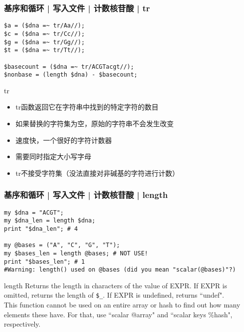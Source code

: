 \begin{frame}[fragile]
  \frametitle{基序和循环 | 写入文件 | 计数核苷酸 | \alert{tr}}
\begin{lstlisting}
$a = ($dna =~ tr/Aa//);
$c = ($dna =~ tr/Cc//);
$g = ($dna =~ tr/Gg//);
$t = ($dna =~ tr/Tt//);

$basecount = ($dna =~ tr/ACGTacgt//);
$nonbase = (length $dna) - $basecount;
\end{lstlisting}
\pause
\begin{block}{tr}
  \begin{itemize}
    \item tr函数返回它在字符串中找到的特定字符的数目
    \item 如果替换的字符集为空，原始的字符串不会发生改变
    \item 速度快，一个很好的字符计数器
    \item 需要同时指定大小写字母
    \item tr不接受字符集（没法直接对非碱基的字符进行计数）
  \end{itemize}
\end{block}
\end{frame}

\begin{frame}[fragile]
  \frametitle{基序和循环 | 写入文件 | 计数核苷酸 | \alert{length}}
\begin{lstlisting}
my $dna = "ACGT";
my $dna_len = length $dna;
print "$dna_len"; # 4

my @bases = ("A", "C", "G", "T");
my $bases_len = length @bases; # NOT USE!
print "$bases_len"; # 1
#Warning: length() used on @bases (did you mean "scalar(@bases)"?)
\end{lstlisting}
\pause
\vspace{-0.5em}
\begin{block}{length}
{\small
Returns the length in characters of the value of EXPR. If EXPR is omitted, returns the length of \verb|$_|. If EXPR is undefined, returns ``undef".\\
\vspace{0.2em}
This function cannot be used on an entire array or hash to find out how many elements these have. For that, use ``\alert{scalar @array}" and ``\alert{scalar keys \%hash}", respectively.
}
\end{block}
\end{frame}

